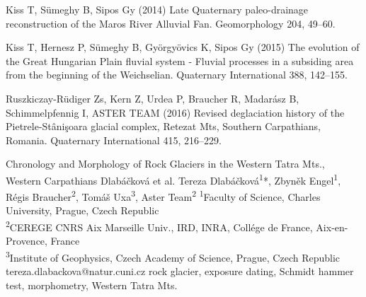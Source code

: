 {Kiss T, Sümeghy B, Sipos Gy (2014) Late Quaternary paleo-drainage reconstruction of the Maros River Alluvial Fan. Geomorphology 204, 49–60.
	
Kiss T, Hernesz P, Sümeghy B, Györgyövics K, Sipos Gy (2015) The evolution of the Great Hungarian Plain fluvial system - Fluvial processes in a subsiding area from the beginning of the Weichselian. Quaternary International 388, 142–155. 
	
Ruszkiczay-Rüdiger Zs, Kern Z, Urdea P, Braucher R, Madarász B, Schimmelpfennig I, ASTER TEAM (2016) Revised deglaciation history of the Pietrele-Stânişoara glacial complex, Retezat Mts, Southern Carpathians, Romania. Quaternary International 415, 216–229.
}%

\abstract
{Chronology and Morphology of Rock Glaciers in the Western Tatra Mts., Western Carpathians} 
{Dlabáčková et al.} 
{Tereza Dlabáčková\textsuperscript{1}*, Zbyněk Engel\textsuperscript{1}, Régis Braucher\textsuperscript{2}, Tomáš Uxa\textsuperscript{3}, Aster Team\textsuperscript{2}} 
{\KLtag} 
{
\textsuperscript{1}Faculty of Science, Charles University, Prague, Czech Republic \\
\textsuperscript{2}CEREGE CNRS Aix Marseille Univ., IRD, INRA, Collége de France, Aix-en-Provence, France\\
\textsuperscript{3}Institute of Geophysics, Czech Academy of Science, Prague, Czech Republic
}
{tereza.dlabackova@natur.cuni.cz}  %
{rock glacier, exposure dating, Schmidt hammer test, morphometry, Western Tatra Mts.}
